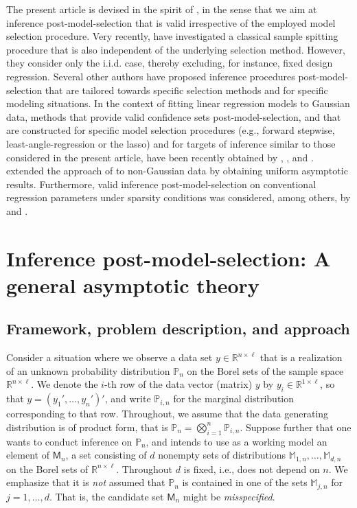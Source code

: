 \documentclass[preprint]{imsart}
\newcommand{\R}{{\mathbb R}}
\renewcommand{\P}{{\mathbb P}}
\numberwithin{equation}{section}
\begin{document}
The present article is devised in the spirit of \cite{Berk13}, in the sense that we aim at inference post-model-selection that is valid irrespective of the employed model selection procedure. Very recently, \cite{Rinaldo16} have investigated a classical sample spitting procedure that is also independent of the underlying selection method. However, they consider only the i.i.d. case, thereby excluding, for instance, fixed design regression. Several other authors have proposed inference procedures post-model-selection that are tailored towards specific selection methods and for specific modeling situations. In the context of fitting linear regression models to Gaussian data, methods that provide valid confidence sets post-model-selection, and that are constructed for specific model selection procedures (e.g., forward stepwise, least-angle-regression or the lasso) and for targets of inference similar to those considered in the present article, have been recently obtained by \cite{tibshirani2014exact}, \cite{LeeTay14}, \cite{Fit15a} and \cite{lee15exact}. \cite{Tib15a} extended the approach of \cite{tibshirani2014exact} to non-Gaussian data by obtaining uniform asymptotic results. Furthermore, valid inference post-model-selection on conventional regression parameters under sparsity conditions was considered, among others, by \citet{Bel11a, Bel14a, van14a} and \citet{Zha14a}.

\newpage

\section{Inference post-model-selection: A general asymptotic theory}
\label{sec:genposi}

\subsection{Framework, problem description, and approach}\label{sec:fram}

Consider a situation where we observe a data set $y\in\R^{n\times\ell}$ that is a realization of an unknown probability distribution $\P_n$ on the Borel sets of the sample space $\R^{n \times \ell}$. We denote the $i$-th row of the data vector (matrix) $y$ by $y_i\in\R^{1\times \ell}$, so that $y=(y_1',\dots, y_n')'$, and write $\P_{i,n}$ for the marginal distribution corresponding to that row. Throughout, we assume that the data generating distribution is of product form, that is $\P_n = \bigotimes_{i=1}^n \P_{i,n}$. Suppose further that one wants to conduct inference on $\mathbb{P}_n$, and intends to use as a working model an element of $\mathsf{M}_n$, a set consisting of $d$ nonempty sets of distributions $\mathbb{M}_{1,n}, \hdots,\mathbb{M}_{d,n}$ on the Borel sets of $\R^{n \times \ell}$. Throughout $d$ is fixed, i.e., does not depend on $n$. We emphasize that it is \textit{not} assumed that $\mathbb{P}_n$ is contained in one of the sets $\mathbb{M}_{j,n}$ for $j = 1, \hdots, d$. That is, the candidate set $\mathsf{M}_n$ might be \textit{misspecified}. 
\end{document}
